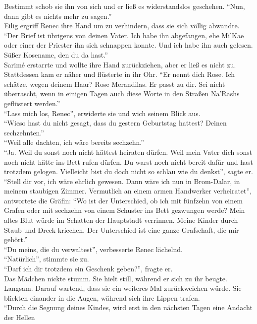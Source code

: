 Bestimmt schob sie ihn von sich und er ließ es widerstandslos geschehen. ``Nun, dann gibt es nichts 
mehr zu sagen.''\\
Eilig ergriff Renec ihre Hand um zu verhindern, dass sie sich völlig abwandte. ``Der Brief ist 
übrigens von deinen Vater. Ich habe ihn abgefangen, ehe Mi'Kae oder einer der Priester ihn sich 
schnappen konnte. Und ich habe ihn auch gelesen. Süßer Kosename, den du da hast.''\\
Sarimé erstarrte und wollte ihre Hand zurückziehen, aber er ließ es nicht zu. Stattdessen kam er 
näher und flüsterte in ihr Ohr. ``Er nennt dich Rose. Ich schätze, wegen deinem Haar? Rose 
Merandilas. Er passt zu dir. Sei nicht überrascht, wenn in einigen Tagen auch diese Worte in den 
Straßen Na'Rashs geflüstert werden.''\\
``Lass mich los, Renec'', erwiderte sie und wich seinem Blick aus.\\
``Wieso hast du nicht gesagt, dass du gestern Geburtstag hattest? Deinen sechzehnten.''\\
``Weil alle dachten, ich wäre bereits sechzehn.''\\
``Ja. Weil du sonst noch nicht hättest heiraten dürfen. Weil mein Vater dich sonst noch nicht hätte 
ins Bett rufen dürfen. Du warst noch nicht bereit dafür und hast trotzdem gelogen. Vielleicht bist 
du doch nicht so schlau wie du denkst'', sagte er.\\
``Stell dir vor, ich wäre ehrlich gewesen. Dann wäre ich nun in Brom-Dalar, in meinem staubigen 
Zimmer. Vermutlich an einem armen Handwerker verheiratet'', antwortete die Gräfin: ``Wo ist der 
Unterschied, ob ich mit fünfzehn von einem Grafen oder mit sechzehn von einem Schuster ins Bett 
gezwungen werde? Mein altes Blut würde im Schatten der Hauptstadt verrinnen. Meine Kinder durch 
Staub und Dreck kriechen. Der Unterschied ist eine ganze Grafschaft, die mir gehört.''\\
``Du meins, die du verwaltest'', verbesserte Renec lächelnd.\\
``Natürlich'', stimmte sie zu.\\
``Darf ich dir trotzdem ein Geschenk geben?'', fragte er.\\
Das Mädchen nickte stumm. Sie hielt still, während er sich zu ihr beugte. Langsam. Darauf 
wartend, dass sie ein weiteres Mal zurückweichen würde. Sie blickten einander in die Augen, während 
sich ihre Lippen trafen.\\
``Durch die Segnung deines Kindes, wird erst in den nächsten Tagen eine Andacht der Hellen 
